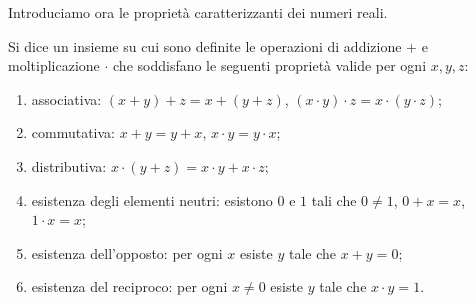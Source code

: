 \begin{comment}
Sia $H$ un altro insieme totalmente ordinato con le stesse proprietà:
un ordine $\le$, una operazione $+$ e un elemento neutro $0_H\in H$.

Allora dato $u\in G$ con $u>0_G$ e dato $v\in H$
con $v>0_H$ esiste una unica funzione $f\colon G \to H$ tale che
\begin{gather}
  f(u) = v  \label{eq:49932}\\
  f(x+y) = f(x)+f(y) \label{eq:4882824}\\
  x\ge y \implies f(x) \ge f(y).
\end{gather}
Inoltre tale funzione $f$ risulta essere bigettiva
ed è dunque un isomorfismo delle due strutture.
\end{theorem}
%
\begin{proof}
Andremo a definire $f$ per gradi. Innanzitutto
dovrà essere $f(u)=v$ per soddisfare~\eqref{eq:49932}.
Poi dovrà essere $f(u+u) = f(u)+f(u) = v+v$,
$f(u+u+u) = f(u+u)+f(u) = v+v+v$
per soddisfare~\eqref{eq:4882824}.
In generale, dato $n\in \NN$ possiamo definire
i multipli $nx$ di un numero $x\in G$ con la seguente
definizione ricorsiva:
\[
 \begin{cases}
 0x = 0_G, \\
 (n+1) x = nx + x.
 \end{cases}
\]
....
\end{proof}
\end{comment}


Introduciamo ora le proprietà caratterizzanti dei numeri reali.

\begin{definition}[campo]\label{def:field}
\label{def:campo}%
Si dice 
un insieme su cui sono definite le operazioni di addizione $+$ e
moltiplicazione $\cdot$ che soddisfano le seguenti proprietà
valide per ogni $x,y,z$:
\begin{enumerate}
\item associativa: $(x+y)+z = x + (y+z)$, $(x\cdot y)\cdot z = x \cdot (y \cdot z)$;
\item commutativa: $x+y=y+x$, $x\cdot y = y \cdot x$;
\item distributiva: $x\cdot (y+z) = x\cdot y + x \cdot z$;
\item esistenza degli elementi neutri: esistono $0$ e $1$
tali che $0\neq 1$, $0+x = x$, $1\cdot x = x$;
\item esistenza dell'opposto: per ogni $x$ esiste $y$ tale che $x+y = 0$;
\item esistenza del reciproco: per ogni $x\neq 0$ esiste $y$ tale che $x \cdot y = 1$.
\end{enumerate}
\end{definition}

